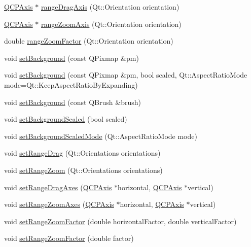 \begin{DoxyCompactItemize}
\item 
\hyperlink{classQCPAxis}{Q\+C\+P\+Axis} $\ast$ \hyperlink{classQCPAxisRect_a6d7c22cfc54fac7a3d6ef80b133a8574}{range\+Drag\+Axis} (Qt\+::\+Orientation orientation)
\item 
\hyperlink{classQCPAxis}{Q\+C\+P\+Axis} $\ast$ \hyperlink{classQCPAxisRect_a679c63f2b8daccfe6ec5110dce3dd3b6}{range\+Zoom\+Axis} (Qt\+::\+Orientation orientation)
\item 
double \hyperlink{classQCPAxisRect_ae4e6c4d143aacc88d2d3c56f117c2fe1}{range\+Zoom\+Factor} (Qt\+::\+Orientation orientation)
\item 
void \hyperlink{classQCPAxisRect_af615ab5e52b8e0a9a0eff415b6559db5}{set\+Background} (const Q\+Pixmap \&pm)
\item 
void \hyperlink{classQCPAxisRect_ac48a2d5d9b7732e73b86605c69c5e4c1}{set\+Background} (const Q\+Pixmap \&pm, bool scaled, Qt\+::\+Aspect\+Ratio\+Mode mode=Qt\+::\+Keep\+Aspect\+Ratio\+By\+Expanding)
\item 
void \hyperlink{classQCPAxisRect_a22a22b8668735438dc06f9a55fe46b33}{set\+Background} (const Q\+Brush \&brush)
\item 
void \hyperlink{classQCPAxisRect_ae6d36c3e0e968ffb991170a018e7b503}{set\+Background\+Scaled} (bool scaled)
\item 
void \hyperlink{classQCPAxisRect_a5ef77ea829c9de7ba248e473f48f7305}{set\+Background\+Scaled\+Mode} (Qt\+::\+Aspect\+Ratio\+Mode mode)
\item 
void \hyperlink{classQCPAxisRect_ae6aef2f7211ba6097c925dcd26008418}{set\+Range\+Drag} (Qt\+::\+Orientations orientations)
\item 
void \hyperlink{classQCPAxisRect_a7960a9d222f1c31d558b064b60f86a31}{set\+Range\+Zoom} (Qt\+::\+Orientations orientations)
\item 
void \hyperlink{classQCPAxisRect_a648cce336bd99daac4a5ca3e5743775d}{set\+Range\+Drag\+Axes} (\hyperlink{classQCPAxis}{Q\+C\+P\+Axis} $\ast$horizontal, \hyperlink{classQCPAxis}{Q\+C\+P\+Axis} $\ast$vertical)
\item 
void \hyperlink{classQCPAxisRect_a9442cca2aa358405f39a64d51eca13d2}{set\+Range\+Zoom\+Axes} (\hyperlink{classQCPAxis}{Q\+C\+P\+Axis} $\ast$horizontal, \hyperlink{classQCPAxis}{Q\+C\+P\+Axis} $\ast$vertical)
\item 
void \hyperlink{classQCPAxisRect_a895d7ac745ea614e04056244b3c138ac}{set\+Range\+Zoom\+Factor} (double horizontal\+Factor, double vertical\+Factor)
\item 
void \hyperlink{classQCPAxisRect_ae83d187b03fc6fa4f00765ad50cd3fc3}{set\+Range\+Zoom\+Factor} (double factor)

\end{DoxyCompactItemize}
